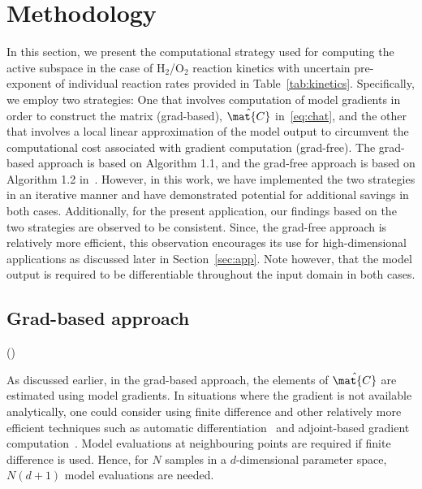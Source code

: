 \section{Methodology}
\label{sec:method}

In this section, we present the computational strategy used for computing the active subspace in the case of
H$_2$/O$_2$ reaction kinetics with uncertain pre-exponent of individual reaction rates provided in
Table~\ref{tab:kinetics}. Specifically, we employ two strategies: One that involves computation of model
gradients in order to construct the matrix (grad-based), $\hat{\mat{C}}$ in~\eqref{eq:chat}, and the other that involves a local 
linear approximation of the model output to circumvent the computational cost associated with gradient
computation (grad-free). The grad-based approach is based on Algorithm 1.1, and the grad-free approach is
based on Algorithm 1.2 in~\cite{Constantine:2015}. However, in this work, we have implemented the
two strategies in an iterative manner and have demonstrated potential for additional savings in both cases.
Additionally, for the present application, our findings based on the two strategies are observed to be consistent.
Since, the grad-free approach is relatively more efficient, this observation encourages its use for high-dimensional
applications as discussed later in Section~\ref{sec:app}. Note however, that the model output is required to be
differentiable throughout the input domain in both cases.

\subsection{Grad-based approach} ()
\label{sub:grad}

As discussed earlier, in the grad-based approach, the elements of $\hat{\mat{C}}$ are estimated using model gradients.
 In situations where the gradient is not available analytically, one could consider using
finite difference and other relatively more efficient techniques such as automatic differentiation~\cite{Kiparissides:2009} 
and adjoint-based gradient computation~\cite{Jameson:1988,Gunzburger:2003,Borzi:2011,Alexanderian:2017}.
Model evaluations at neighbouring points are required if finite difference is used. Hence, for 
$N$ samples in a $d$-dimensional parameter space, $N(d+1)$ model evaluations are needed. 

